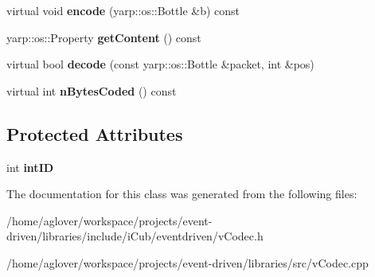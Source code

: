 \begin{DoxyCompactItemize}
\item 
virtual void {\bfseries encode} (yarp\+::os\+::\+Bottle \&b) const \hypertarget{classev_1_1InterestEvent_a4a0106bc9e49bc7439402f85531f3e05}{}\label{classev_1_1InterestEvent_a4a0106bc9e49bc7439402f85531f3e05}

\item 
yarp\+::os\+::\+Property {\bfseries get\+Content} () const \hypertarget{classev_1_1InterestEvent_a24fcac627ac04495434bc5f41b2bbe88}{}\label{classev_1_1InterestEvent_a24fcac627ac04495434bc5f41b2bbe88}

\item 
virtual bool {\bfseries decode} (const yarp\+::os\+::\+Bottle \&packet, int \&pos)\hypertarget{classev_1_1InterestEvent_a4e1d28f09a9e4e75a7e9019c37bfe3ad}{}\label{classev_1_1InterestEvent_a4e1d28f09a9e4e75a7e9019c37bfe3ad}

\item 
virtual int {\bfseries n\+Bytes\+Coded} () const \hypertarget{classev_1_1InterestEvent_aebd398321f2b4dc3f04a94c7d96802f2}{}\label{classev_1_1InterestEvent_aebd398321f2b4dc3f04a94c7d96802f2}

\end{DoxyCompactItemize}
\subsection*{Protected Attributes}
\begin{DoxyCompactItemize}
\item 
int {\bfseries int\+ID}\hypertarget{classev_1_1InterestEvent_ab71373afcb8a966d3cef8b91f31d114f}{}\label{classev_1_1InterestEvent_ab71373afcb8a966d3cef8b91f31d114f}

\end{DoxyCompactItemize}


The documentation for this class was generated from the following files\+:\begin{DoxyCompactItemize}
\item 
/home/aglover/workspace/projects/event-\/driven/libraries/include/i\+Cub/eventdriven/v\+Codec.\+h\item 
/home/aglover/workspace/projects/event-\/driven/libraries/src/v\+Codec.\+cpp\end{DoxyCompactItemize}
